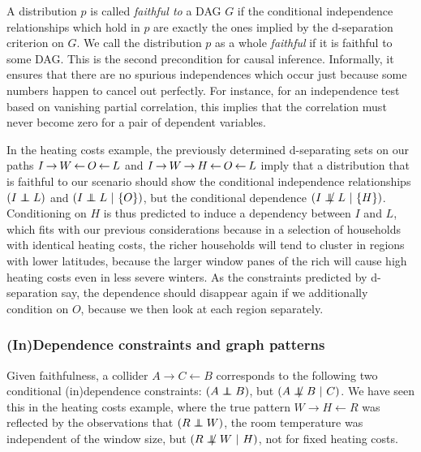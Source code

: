 A distribution $p$ is called \textit{faithful to} a DAG $G$ if the conditional independence relationships which hold in $p$ are exactly the ones implied by the d-separation criterion on $G$. We call the distribution $p$ as a whole \textit{faithful} if it is faithful to some DAG. This \textit{} is the second precondition for causal inference. Informally, it ensures that there are no spurious independences which occur just because some numbers happen to cancel out perfectly. For instance, for an independence test based on vanishing partial correlation, this implies that the correlation must never become zero for a pair of dependent variables.

In the heating costs example, the previously determined d-separating sets on our paths $I \kern 2pt\hbox{$\rightarrow$}\kern 2pt W \kern 2pt\hbox{$\leftarrow$}\kern 2pt O \kern 2pt\hbox{$\leftarrow$}\kern 2pt L$ and $I \kern 2pt\hbox{$\rightarrow$}\kern 2pt W \kern 2pt\hbox{$\rightarrow$}\kern 2pt H \kern 2pt\hbox{$\leftarrow$}\kern 2pt O \kern 2pt\hbox{$\leftarrow$}\kern 2pt L$ imply that a distribution that is faithful to our scenario should show the conditional independence relationships $(I \independent L)$ and $(I \independent L\ |\ \{O\})$, but the conditional dependence $(I \notindep L\ |\ \{H\})$. Conditioning on $H$ is thus
predicted to induce a dependency between $I$ and $L$, which fits with our previous considerations because in a selection of households with identical heating costs, the richer households will tend to cluster in regions with lower latitudes, because the larger window panes of the rich will cause high heating costs even in less severe winters. As the constraints predicted by d-separation say, the dependence should disappear again if we additionally condition on $O$, because we then look at each region separately.

\subsubsection{(In)Dependence constraints and graph patterns}
Given faithfulness, a collider $A \rightarrow C \leftarrow B$ corresponds to the following two conditional (in)dependence constraints: $(A \independent B)$, but $(A \notindep B\ |\ C)$. We have seen this in the heating costs example, where the true pattern $W \rightarrow H \leftarrow R$ was reflected by the observations that $(R \independent W)$, the room temperature was independent of the window size, but $(R \notindep W\ |\ H)$, not for fixed heating costs.

